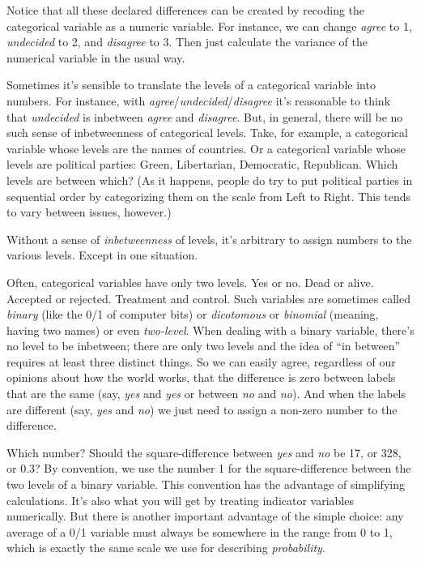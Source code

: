 \documentclass[]{tufte-book}
\begin{document}
Notice that all these declared differences can be created by recoding the categorical variable as a numeric variable. For instance, we can change \emph{agree} to 1, \emph{undecided} to 2, and \emph{disagree} to 3. Then just calculate the variance of the numerical variable in the usual way.

Sometimes it's sensible to translate the levels of a categorical variable into numbers. For instance, with \emph{agree}/\emph{undecided}/\emph{disagree} it's reasonable to think that \emph{undecided} is inbetween \emph{agree} and \emph{disagree}. But, in general, there will be no such sense of inbetweenness of categorical levels. Take, for example, a categorical variable whose levels are the names of countries. Or a categorical variable whose levels are political parties: Green, Libertarian, Democratic, Republican. Which levels are between which? (As it happens, people do try to put political parties in sequential order by categorizing them on the scale from Left to Right. This tends to vary between issues, however.)

Without a sense of \emph{inbetweenness} of levels, it's arbitrary to assign numbers to the various levels. Except in one situation.

Often, categorical variables have only two levels. Yes or no. Dead or alive. Accepted or rejected. Treatment and control. Such variables are sometimes called \emph{binary} (like the 0/1 of computer bits) or \emph{dicotomous} or \emph{binomial} (meaning, having two names) or even \emph{two-level}. When dealing with a binary variable, there's no level to be inbetween; there are only two levels and the idea of ``in between'' requires at least three distinct things. So we can easily agree, regardless of our opinions about how the world works, that the difference is zero between labels that are the same (say, \emph{yes} and \emph{yes} or between \emph{no} and \emph{no}). And when the labels are different (say, \emph{yes} and \emph{no}) we just need to assign a non-zero number to the difference.

Which number? Should the square-difference between \emph{yes} and \emph{no} be 17, or 328, or 0.3? By convention, we use the number 1 for the square-difference between the two levels of a binary variable. This convention has the advantage of simplifying calculations. It's also what you will get by treating indicator variables numerically. But there is another important advantage of the simple choice: any average of a 0/1 variable must always be somewhere in the range from 0 to 1, which is exactly the same scale we use for describing \emph{probability}.
\end{document}
